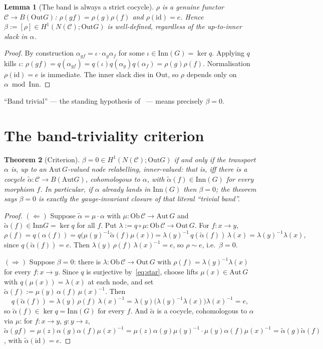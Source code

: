 \documentclass[11pt]{article}
\newtheorem{theorem}{Theorem}
\newtheorem{lemma}[theorem]{Lemma}
\theoremstyle{definition}
\newcommand{\C}{\mathcal{C}}
\newcommand{\Ob}{\mathrm{Ob}}
\newcommand{\id}{\mathrm{id}}
\newcommand{\Aut}{\mathrm{Aut}}
\newcommand{\Inn}{\mathrm{Inn}}
\newcommand{\Out}{\mathrm{Out}}
\begin{document}
\begin{lemma}[The band is always a strict cocycle]\label{lem:band}
$\rho$ is a genuine functor $\C\to B(\Out G)$: $\rho(gf)=\rho(g)\rho(f)$ and $\rho(\id)=e$. Hence
$\beta:=[\rho]\in H^1(N(\C);\Out G)$ is well-defined, regardless of the up-to-inner slack in $\alpha$.
\end{lemma}

\begin{proof}
By construction $\alpha_{gf}=\iota\cdot\alpha_g\alpha_f$ for some $\iota\in\Inn(G)=\ker q$. Applying
$q$ kills $\iota$: $\rho(gf)=q(\alpha_{gf})=q(\iota)q(\alpha_g)q(\alpha_f)=\rho(g)\rho(f)$.
Normalisation $\rho(\id)=e$ is immediate. The inner slack dies in $\Out$, so $\rho$ depends only on
$\alpha\bmod\Inn$.
\end{proof}

``Band trivial'' --- the standing hypothesis of~\cite{gerbenote} --- means precisely $\beta=0$.

\section{The band-triviality criterion}\label{sec:a}

\begin{theorem}[Criterion]\label{thm:a}
$\beta=0\in H^1(N(\C);\Out G)$ if and only if the transport $\alpha$ is, up to an $\Aut\,G$-valued
node relabelling, inner-valued: that is, iff there is a cocycle $\tilde\alpha:\C\to B(\Aut G)$,
cohomologous to $\alpha$, with $\tilde\alpha(f)\in\Inn(G)$ for every morphism $f$. In particular, if
$\alpha$ already lands in $\Inn(G)$ then $\beta=0$; the theorem says $\beta=0$ is exactly the
gauge-invariant closure of that literal ``trivial band''.
\end{theorem}

\begin{proof}
$(\Leftarrow)$ Suppose $\tilde\alpha=\mu\cdot\alpha$ with $\mu:\Ob\,\C\to\Aut\,G$ and
$\tilde\alpha(f)\in\Inn G=\ker q$ for all $f$. Put $\lambda:=q\circ\mu:\Ob\,\C\to\Out\,G$. For
$f:x\to y$,
\[
\rho(f)=q(\alpha(f))=q\bigl(\mu(y)^{-1}\tilde\alpha(f)\mu(x)\bigr)
=\lambda(y)^{-1}\,q(\tilde\alpha(f))\,\lambda(x)=\lambda(y)^{-1}\lambda(x),
\]
since $q(\tilde\alpha(f))=e$. Then $\lambda(y)\,\rho(f)\,\lambda(x)^{-1}=e$, so $\rho\sim e$, i.e.\
$\beta=0$.

$(\Rightarrow)$ Suppose $\beta=0$: there is $\lambda:\Ob\,\C\to\Out\,G$ with
$\rho(f)=\lambda(y)^{-1}\lambda(x)$ for every $f:x\to y$. Since $q$ is surjective by~\eqref{eq:star},
choose lifts $\mu(x)\in\Aut\,G$ with $q(\mu(x))=\lambda(x)$ at each node, and set
$\tilde\alpha(f):=\mu(y)\,\alpha(f)\,\mu(x)^{-1}$. Then
\[
q(\tilde\alpha(f))=\lambda(y)\,\rho(f)\,\lambda(x)^{-1}
=\lambda(y)\bigl(\lambda(y)^{-1}\lambda(x)\bigr)\lambda(x)^{-1}=e,
\]
so $\tilde\alpha(f)\in\ker q=\Inn(G)$ for every $f$. And $\tilde\alpha$ is a cocycle, cohomologous to
$\alpha$ via $\mu$: for $f:x\to y$, $g:y\to z$,
$\tilde\alpha(gf)=\mu(z)\alpha(g)\alpha(f)\mu(x)^{-1}
=\mu(z)\alpha(g)\mu(y)^{-1}\cdot\mu(y)\alpha(f)\mu(x)^{-1}=\tilde\alpha(g)\tilde\alpha(f)$, with
$\tilde\alpha(\id)=e$.
\end{proof}
\end{document}
